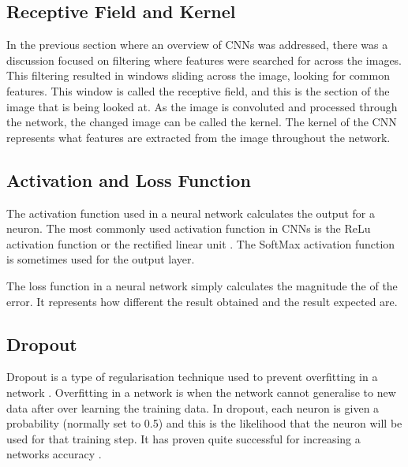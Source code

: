 
\tocless\subsection{Receptive Field and Kernel}
In the previous section where an overview of CNNs was addressed, there was a discussion focused on filtering where features were searched for across the images.
This filtering resulted in windows sliding across the image, looking for common features.
This window is called the receptive field, and this is the section of the image that is being looked at.
As the image is convoluted and processed through the network, the changed image can be called the kernel.
The kernel of the CNN represents what features are extracted from the image throughout the network.


\tocless\subsection{Activation and Loss Function}
The activation function used in a neural network calculates the output for a neuron.
The most commonly used activation function in CNNs is the ReLu activation function or the rectified linear unit \parencite{handsOnML}.
The SoftMax activation function is sometimes used for the output layer.

The loss function in a neural network simply calculates the magnitude the of the error.
It represents how different the result obtained and the result expected are.


\tocless\subsection{Dropout}
Dropout is a type of regularisation technique used to prevent overfitting in a network \parencite{handsOnML}.
Overfitting in a network is when the network cannot generalise to new data after over learning the training data.
In dropout, each neuron is given a probability (normally set to 0.5) and this is the likelihood that the neuron will be used for that training step.
It has proven quite successful for increasing a networks accuracy \parencite{handsOnML}.


